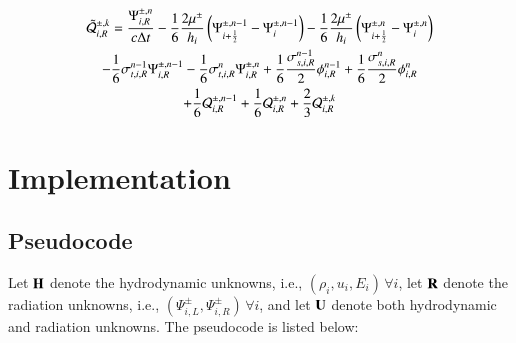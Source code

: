 \documentclass[preprint,12pt]{elsarticle}
\begin{document}
\begin{multline}
  \tilde{\mathcal{Q}}_{i,R}^{\pm,k}
  = \frac{\Psi_{i,R}^{\pm,n}}{c\Delta t}
  - \frac{1}{6}\frac{2\mu^\pm}{h_i}\left( \Psi_{i+\frac{1}{2}}^{\pm,n-1} - \Psi_i^{\pm,n-1} \right)
  - \frac{1}{6}\frac{2\mu^\pm}{h_i}\left( \Psi_{i+\frac{1}{2}}^{\pm,n}   - \Psi_i^{\pm,n} \right)\\
  - \frac{1}{6}\sigma_{t,i,R}^{n-1}\Psi_{i,R}^{\pm,n-1}
  - \frac{1}{6}\sigma_{t,i,R}^n    \Psi_{i,R}^{\pm,n}
  + \frac{1}{6}\frac{\sigma_{s,i,R}^{n-1}}{2}\phi_{i,R}^{n-1}
  + \frac{1}{6}\frac{\sigma_{s,i,R}^n}{2}    \phi_{i,R}^n\\
  + \frac{1}{6}\mathcal{Q}_{i,R}^{\pm,n-1}
  + \frac{1}{6}\mathcal{Q}_{i,R}^{\pm,n}
  + \frac{2}{3}\mathcal{Q}_{i,R}^{\pm,k}
\end{multline}

\section{Implementation}
\subsection{Pseudocode}
Let $\mathbf{H}$ denote the hydrodynamic unknowns, i.e., $(\rho_i,u_i,E_i)\,\forall i$,
let $\mathbf{R}$ denote the radiation unknowns, i.e., $(\Psi_{i,L}^\pm,\Psi_{i,R}^\pm)
\,\forall i$, and let $\mathbf{U}$ denote both hydrodynamic and radiation
unknowns. The pseudocode is listed below:
\end{document}
